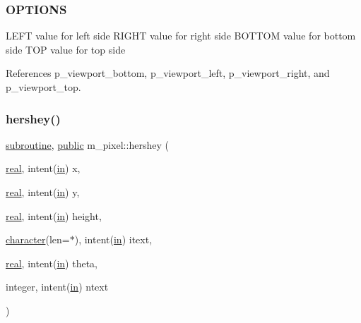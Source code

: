 \subsubsection*{O\+P\+T\+I\+O\+NS}

L\+E\+FT value for left side R\+I\+G\+HT value for right side B\+O\+T\+T\+OM value for bottom side T\+OP value for top side 

References p\+\_\+viewport\+\_\+bottom, p\+\_\+viewport\+\_\+left, p\+\_\+viewport\+\_\+right, and p\+\_\+viewport\+\_\+top.

\mbox{\label{namespacem__pixel_a80dc3cb149287470a9837de8dd3f05bc}} 
\subsubsection{\texorpdfstring{hershey()}{hershey()}}
{\footnotesize\ttfamily \hyperlink{M__stopwatch_83_8txt_acfbcff50169d691ff02d4a123ed70482}{subroutine}, \hyperlink{M__stopwatch_83_8txt_a2f74811300c361e53b430611a7d1769f}{public} m\+\_\+pixel\+::hershey (\begin{DoxyParamCaption}\item[{\hyperlink{read__watch_83_8txt_abdb62bde002f38ef75f810d3a905a823}{real}, intent(\hyperlink{M__journal_83_8txt_afce72651d1eed785a2132bee863b2f38}{in})}]{x,  }\item[{\hyperlink{read__watch_83_8txt_abdb62bde002f38ef75f810d3a905a823}{real}, intent(\hyperlink{M__journal_83_8txt_afce72651d1eed785a2132bee863b2f38}{in})}]{y,  }\item[{\hyperlink{read__watch_83_8txt_abdb62bde002f38ef75f810d3a905a823}{real}, intent(\hyperlink{M__journal_83_8txt_afce72651d1eed785a2132bee863b2f38}{in})}]{height,  }\item[{\hyperlink{option__stopwatch_83_8txt_abd4b21fbbd175834027b5224bfe97e66}{character}(len=$\ast$), intent(\hyperlink{M__journal_83_8txt_afce72651d1eed785a2132bee863b2f38}{in})}]{itext,  }\item[{\hyperlink{read__watch_83_8txt_abdb62bde002f38ef75f810d3a905a823}{real}, intent(\hyperlink{M__journal_83_8txt_afce72651d1eed785a2132bee863b2f38}{in})}]{theta,  }\item[{integer, intent(\hyperlink{M__journal_83_8txt_afce72651d1eed785a2132bee863b2f38}{in})}]{ntext }\end{DoxyParamCaption})}



